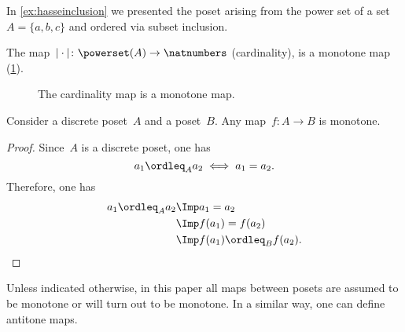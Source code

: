 
\begin{example}
\end{example}

\begin{example}
  In \cref{ex:hasseinclusion} we presented the poset arising from the power set of a set~$A=\{a,b,c\}$ and ordered via subset inclusion.

  The map~$\vert \cdot \vert \colon \powerset(A)\to \natnumbers$ (cardinality), is a monotone map (\cref{fig:cardinality}).
  \begin{figure}[h!]
    \begin{center}
    \end{center}
    \caption{The cardinality map is a monotone map. \label{fig:cardinality}}
  \end{figure}
\end{example}

\begin{lemma}
  Consider a discrete poset~$A$ and a poset~$B$. Any map~$f\colon A\to B$ is monotone.
\end{lemma}
\begin{proof}
  Since~$A$ is a discrete poset, one has
  \begin{equation}
    a_1\ordleq_A a_2 \iff a_1=a_2.
  \end{equation}
  Therefore, one has
  \begin{equation}
    \begin{aligned}
      a_1\ordleq_A a_2 &\Imp a_1=a_2\\
      &\Imp f(a_1)=f(a_2)\\
      &\Imp f(a_1)\ordleq_B f(a_2).
    \end{aligned}
  \end{equation}
\end{proof}
Unless indicated otherwise, in this paper all maps between posets are assumed to be monotone or will turn out to be monotone. In a similar way, one can define antitone maps.


